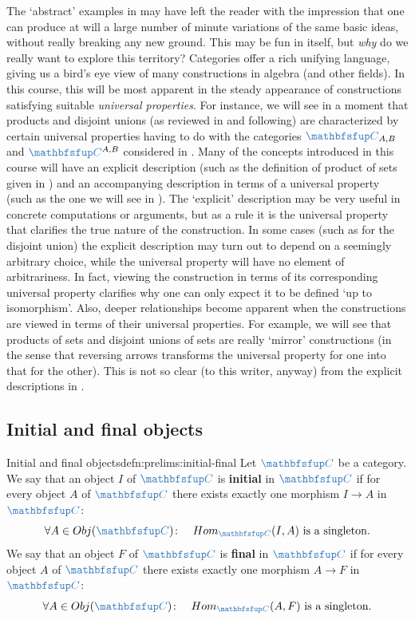 The `abstract' examples in  may have
left the reader with the impression that one can produce at will a
large number of minute variations of the same basic ideas, without
really breaking any new ground. This may be fun in itself, but
\emph{why} do we really want to explore this territory?  Categories
offer a rich unifying language, giving us a bird's eye view of many
constructions in algebra (and other fields). In this course, this will
be most apparent in the steady appearance of constructions satisfying
suitable \emph{universal properties}. For instance, we will see in a
moment that products and disjoint unions (as reviewed in
 and following) are
characterized by certain universal properties having to do with the
categories $\categ{C}_{A,B}$ and $\categ{C}^{A,B}$ considered in
.  Many of the concepts introduced
in this course will have an explicit description (such as the
definition of product of sets given in
) and an accompanying
description in terms of a universal property (such as the one we will
see in ). The `explicit' description
may be very useful in concrete computations or arguments, but as a
rule it is the universal property that clarifies the true nature of
the construction. In some cases (such as for the disjoint union) the
explicit description may turn out to depend on a seemingly arbitrary
choice, while the universal property will have no element of
arbitrariness. In fact, viewing the construction in terms of its
corresponding universal property clarifies why one can only expect it
to be defined `up to isomorphism'.  Also, deeper relationships become
apparent when the constructions are viewed in terms of their universal
properties. For example, we will see that products of sets and
disjoint unions of sets are really `mirror' constructions (in the
sense that reversing arrows transforms the universal property for one
into that for the other). This is not so clear (to this writer,
anyway) from the explicit descriptions in
.

\subsection{Initial and final objects}%
\label{subsec:prelims:initial-and-final-objects}

\begin{defn}{Initial and final objects}{defn:prelims:initial-final}
  Let $\categ{C}$ be a category. We say that an object $I$ of
  $\categ{C}$ is \textbf{initial} in $\categ{C}$ if for every object
  $A$ of $\categ{C}$ there exists exactly one morphism $I \to A$ in
  $\categ{C}$:
  \[
    \forall A \in \Obj(\categ{C}) \colon \quad \Hom_{\categ{C}}(I,A)
    \text{ is a singleton.}
  \]
  We say that an object $F$ of $\categ{C}$ is \textbf{final} in
  $\categ{C}$ if for every object $A$ of $\categ{C}$ there exists
  exactly one morphism $A \to F$ in $\categ{C}$:
  \[
    \forall A \in \Obj(\categ{C}) \colon \quad \Hom_{\categ{C}}(A,F)
    \text{ is a singleton.}
  \]
\end{defn}

